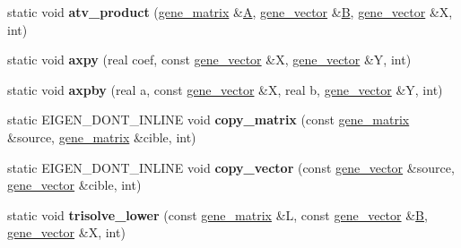 \begin{DoxyCompactItemize}
\item 
\mbox{\label{classeigen3__interface_aad51fe2780f6070ea2abc59062c59dbd}} 
static void {\bfseries atv\+\_\+product} (\hyperlink{group___core___module_class_eigen_1_1_matrix}{gene\+\_\+matrix} \&\hyperlink{group___core___module_class_eigen_1_1_matrix}{A}, \hyperlink{group___core___module_class_eigen_1_1_matrix}{gene\+\_\+vector} \&\hyperlink{group___core___module_class_eigen_1_1_matrix}{B}, \hyperlink{group___core___module_class_eigen_1_1_matrix}{gene\+\_\+vector} \&X, int)
\item 
\mbox{\label{classeigen3__interface_afc30971485ac0aafb6480ff971e37b19}} 
static void {\bfseries axpy} (real coef, const \hyperlink{group___core___module_class_eigen_1_1_matrix}{gene\+\_\+vector} \&X, \hyperlink{group___core___module_class_eigen_1_1_matrix}{gene\+\_\+vector} \&Y, int)
\item 
\mbox{\label{classeigen3__interface_a3424dac789f77fb487f69930f9efde11}} 
static void {\bfseries axpby} (real a, const \hyperlink{group___core___module_class_eigen_1_1_matrix}{gene\+\_\+vector} \&X, real b, \hyperlink{group___core___module_class_eigen_1_1_matrix}{gene\+\_\+vector} \&Y, int)
\item 
\mbox{\label{classeigen3__interface_a8a3c0694dd89ae269aa3f42495f03929}} 
static E\+I\+G\+E\+N\+\_\+\+D\+O\+N\+T\+\_\+\+I\+N\+L\+I\+NE void {\bfseries copy\+\_\+matrix} (const \hyperlink{group___core___module_class_eigen_1_1_matrix}{gene\+\_\+matrix} \&source, \hyperlink{group___core___module_class_eigen_1_1_matrix}{gene\+\_\+matrix} \&cible, int)
\item 
\mbox{\label{classeigen3__interface_a2d8729cf5829bc05b71c67c6d9abe03a}} 
static E\+I\+G\+E\+N\+\_\+\+D\+O\+N\+T\+\_\+\+I\+N\+L\+I\+NE void {\bfseries copy\+\_\+vector} (const \hyperlink{group___core___module_class_eigen_1_1_matrix}{gene\+\_\+vector} \&source, \hyperlink{group___core___module_class_eigen_1_1_matrix}{gene\+\_\+vector} \&cible, int)
\item 
\mbox{\label{classeigen3__interface_a80c1abf491f0c583a810e09cf2700ae3}} 
static void {\bfseries trisolve\+\_\+lower} (const \hyperlink{group___core___module_class_eigen_1_1_matrix}{gene\+\_\+matrix} \&L, const \hyperlink{group___core___module_class_eigen_1_1_matrix}{gene\+\_\+vector} \&\hyperlink{group___core___module_class_eigen_1_1_matrix}{B}, \hyperlink{group___core___module_class_eigen_1_1_matrix}{gene\+\_\+vector} \&X, int)

\end{DoxyCompactItemize}
